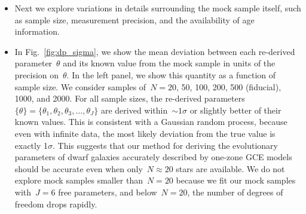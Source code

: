 \documentclass[ms.tex]{subfiles}
\begin{document}
\begin{itemize}

	\item Next we explore variations in details surrounding the mock sample
	itself, such as sample size, measurement precision, and the availability of
	age information.

	\item In Fig.~\ref{fig:dp_sigma}, we show the mean deviation between each
	re-derived parameter~$\theta$ and its known value from the mock sample in
	units of the precision on~$\theta$.
	In the left panel, we show this quantity as a function of sample size.
	We consider samples of~$N = 20$, 50, 100, 200, 500 (fiducial), 1000, and
	2000.
	For all sample sizes, the re-derived parameters
	$\{\theta\} = \{\theta_1, \theta_2, \theta_3, ..., \theta_J\}$ are
	derived within~$\sim1\sigma$ or slightly better of their known values.
	This is consistent with a Gaussian random process, because even with
	infinite data, the most likely deviation from the true value is exactly
	1$\sigma$.
	This suggests that our method for deriving the evolutionary parameters of
	dwarf galaxies accurately described by one-zone GCE models should be
	accurate even when only~$N \approx 20$ stars are available.
	We do not explore mock samples smaller than~$N = 20$ because we fit our
	mock samples with~$J = 6$ free parameters, and below~$N = 20$, the number
	of degrees of freedom drops rapidly.

\end{itemize}
\end{document}
